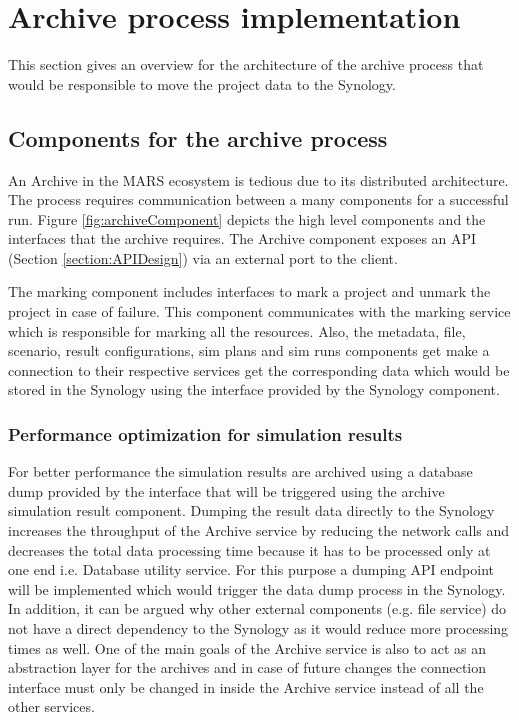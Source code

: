 \section{Archive process implementation}
This section gives an overview for the architecture of the archive process that would be responsible
to move the project data to the Synology. 

\subsection{Components for the archive process}
An Archive in the MARS ecosystem is tedious due to its distributed architecture. The process requires communication between a many components for a 
successful run. Figure \ref{fig:archiveComponent} depicts the high level components and the interfaces that the archive requires. The Archive
component exposes an API (Section \ref{section:APIDesign}) via an external port to the client. 

The marking component includes interfaces to mark a project and unmark the project in case of failure. This component communicates with the marking service which
is responsible for marking all the resources. Also, the metadata, file, scenario, result configurations, sim plans and sim runs components get make a connection to 
their respective services get the corresponding data which would be stored in the Synology using the interface provided by the Synology component.

\subsubsection{Performance optimization for simulation results}
For better performance
the simulation results are archived  using a database dump provided by the interface that will be triggered using the archive simulation result component. 
Dumping the result data directly to the Synology increases the throughput of the Archive service by reducing the network calls and decreases the total data processing
time because it has to be processed only at one end i.e. Database utility service. For this purpose a dumping API endpoint will be implemented which would trigger the data dump process in the 
Synology. In addition, it can be argued why other external components (e.g. file service) do not have a direct dependency to the Synology as it would reduce more
processing times as well. One of the main goals of the Archive service is also to act as an abstraction layer for the archives and in case of future changes the
connection interface must only be changed in inside the Archive service instead of all the other services.

